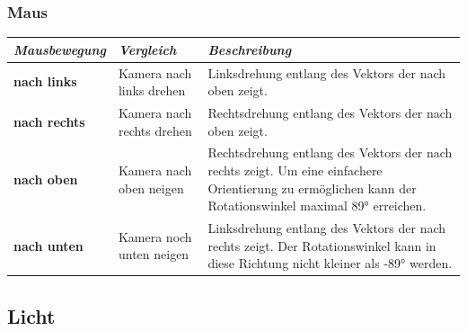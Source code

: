 \documentclass{article}
\begin{document}
\subsubsection{Maus}
\begin{table}[H]
    \begin{tabular}{|l|l|p{74mm}|}
\hline
\textit{\textbf{Mausbewegung}} & \textit{\textbf{Vergleich}} & \textit{\textbf{Beschreibung}}\\ \hline
\textbf{nach links}            & Kamera nach links drehen    & Linksdrehung entlang des Vektors der nach oben zeigt.\\ \hline
\textbf{nach rechts} & Kamera nach rechts drehen & Rechtsdrehung entlang des Vektors der nach oben zeigt.  \\ \hline
\textbf{nach oben}             & Kamera nach oben neigen     & Rechtsdrehung entlang des Vektors
der nach rechts zeigt. Um eine einfachere Orientierung zu ermöglichen kann der Rotationswinkel maximal
\ang{89} erreichen.\\ \hline
\textbf{nach unten}  & Kamera noch unten neigen  & Linksdrehung entlang des Vektors der nach rechts zeigt.
Der Rotationswinkel kann in diese Richtung nicht kleiner als \ang{-89} werden.\\ \hline
\end{tabular}
\end{table}
\subsection{Licht}
\end{document}
